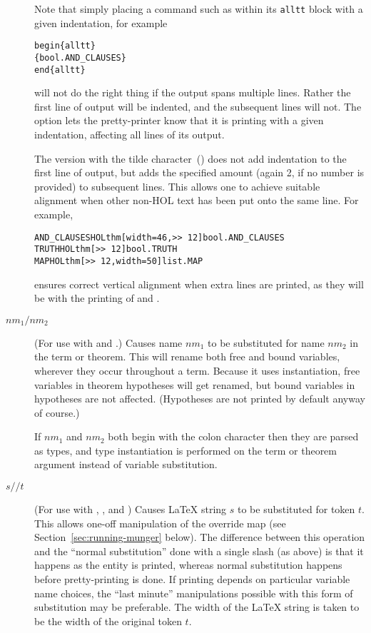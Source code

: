 \begin{description}
  Note that simply placing a command such as \holthm{} within its \texttt{alltt} block with a given indentation, for example
\begin{alltt}
   \bs{}begin\{alltt\}
      \holthm\{bool.AND_CLAUSES\}
   \bs{}end\{alltt\}
\end{alltt}
will not do the right thing if the output spans multiple lines.
%
Rather the first line of \HOL{} output will be indented, and the subsequent lines will not.
%
The \texttt{\indentoption} option lets the pretty-printer know that it is printing with a given indentation, affecting all lines of its output.

The version with the tilde character~(\td) does not add indentation to the first line of output, but adds the specified amount (again 2, if no number is provided) to subsequent lines.
This allows one to achieve suitable alignment when other non-HOL text has been put onto the same line.
For example,
\begin{alltt}
  AND_CLAUSES \bs{}HOLthm[width=46,>>~12]\lb{}bool.AND_CLAUSES\rb
  TRUTH       \bs{}HOLthm[>>~12]\lb{}bool.TRUTH\rb
  MAP         \bs{}HOLthm[>>~12,width=50]\lb{}list.MAP\rb
\end{alltt}
ensures correct vertical alignment when extra lines are printed, as they will be with the printing of  and .

\item[$\mathit{nm}_1\mathtt{/}\mathit{nm}_2$] (For use with \holtm{}
  and \holthm{}.)
%
Causes name $\mathit{nm}_1$ to be substituted for name $\mathit{nm}_2$ in the term or theorem.
%
This will rename both free and bound variables, wherever they occur throughout a term.
%
Because it uses instantiation, free variables in theorem hypotheses will get renamed, but bound variables in hypotheses are not affected.
%
(Hypotheses are not printed by default anyway of course.)

If $\mathit{nm}_1$ and $\mathit{nm}_2$ both begin with the colon character then they are parsed as types, and type instantiation is performed on the term or theorem argument instead of variable substitution.

\item[$s\mathtt{//}t$] (For use with \holtm{}, \holthm, and \holty) Causes \LaTeX{} string $s$ to be substituted for token $t$.
This allows one-off manipulation of the override map (see Section~\ref{sec:running-munger} below).
The difference between this operation and the ``normal substitution'' done with a single slash (as above) is that it happens as the \HOL{} entity is printed, whereas normal substitution happens before pretty-printing is done.
If printing depends on particular variable name choices, the ``last minute'' manipulations possible with this form of substitution may be preferable.
The width of the \LaTeX{} string is taken to be the width of the original token $t$.
\end{description}

